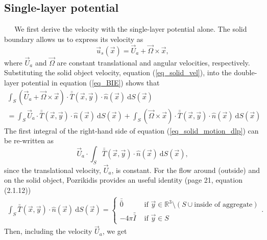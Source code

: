 \subsection{Single-layer potential}
$\ \ \ \ \ $ 
We first derive the velocity with the single-layer potential alone.
The solid boundary allows us to express its velocity as 
\begin{equation}
	\vec{u}_s \left( \vec{x} \right) 
	= \vec{U}_a + \vec{\Omega} \times \vec{x}  ,
	\label{eq_solid_vel}
\end{equation}
where $\vec{U}_a$ and $\vec{\Omega}$ are constant translational and angular velocities, respectively. 
Substituting the solid object velocity, equation (\ref{eq_solid_vel}), into the double-layer potential in equation (\ref{eq_BIE}) shows that 
\begin{align}
	\int_S
	\left( \vec{U}_a + \vec{\Omega} \times \vec{x} \right)
	 \cdot  \bar{\bar{T}}(\vec{x},\vec{y})  
	\cdot \hat{n} ( \vec{x})
	\ \text{d}S(\vec{x})
    \nonumber \\
	= 
	\int_S
	\vec{U}_a
	 \cdot  \bar{\bar{T}}(\vec{x},\vec{y})  
	\cdot \hat{n} ( \vec{x})
	\ \text{d}S(\vec{x})
     + 	
	\int_S
	\left(  \vec{\Omega} \times \vec{x} \right)
	 \cdot  \bar{\bar{T}}(\vec{x},\vec{y})  
	\cdot \hat{n} ( \vec{x})
	\ \text{d}S(\vec{x})
	\label{eq_solid_motion_dlp}
\end{align}
The first integral of the right-hand side of equation (\ref{eq_solid_motion_dlp}) can be re-written as 
\begin{equation}
	\vec{U}_a \cdot
	\int_S
	  \bar{\bar{T}}(\vec{x},\vec{y})  
	\cdot \hat{n} ( \vec{x})
	\ \text{d}S(\vec{x}),
	\label{eq_solid_motion_dlp_Ua}
\end{equation}
since the translational velocity, $\vec{U}_a$, is constant. 
For the flow around (outside) and on the solid object, Pozrikidis provides an useful identity \cite{pozrikidis_boundary_1992} (page 21, equation (2.1.12))
\begin{align}
	\int_S  \bar{\bar{T}}(\vec{x},\vec{y}) \cdot \hat{n} ( \vec{x})
	\ \text{d}S(\vec{x})
	=
	 \begin{cases}
	 \bar{\bar{0}} & \text{ if } \vec{y} \in \mathbb{R}^3  \setminus  \left( S \cup {\text{inside of aggregate}}\right) 	\\ 
	 - 4\pi \bar{\bar{I}} & \text{ if } \vec{y} \in S 
	 \end{cases}.
	\label{eq_dlp_identity1}
\end{align}
Then, including the velocity $\vec{U}_a$, we get
